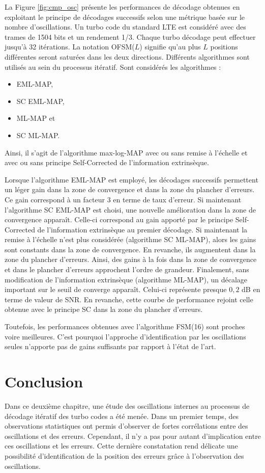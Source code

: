 La Figure \ref{fig:cmp_osc} présente les performances de décodage obtenues en exploitant le principe de décodages successifs selon une 
métrique basée sur le nombre d'oscillations. Un turbo code du standard LTE est considéré avec des trames de 1504 bits et un 
rendement 1/3. Chaque turbo décodage peut effectuer jusqu'à 32 itérations. La notation OFSM($L$) signifie qu'au plus $L$ 
positions différentes seront saturées dans les deux directions. Différents algorithmes sont utilisés au sein du
processus itératif. Sont considérés les algorithmes :
\begin{itemize}
 	\item EML-MAP,
 	\item SC EML-MAP,
 	\item ML-MAP et 
 	\item SC ML-MAP.
 \end{itemize} 
 Ainsi, il s'agit de l'algorithme 
max-log-MAP avec ou sans remise à l'échelle et avec ou sans principe Self-Corrected de l'information extrinsèque.

Lorsque l'algorithme EML-MAP est employé, les décodages successifs permettent un léger gain dans la zone de convergence 
et dans la zone du plancher d'erreurs. Ce gain correspond à un facteur 3 en terme de taux d'erreur. Si maintenant l'algorithme SC EML-MAP 
est  choisi, une nouvelle amélioration dans la zone de convergence apparaît. Celle-ci correspond au gain apporté par le 
principe Self-Corrected de l'information extrinsèque au premier décodage. Si maintenant la remise à l'échelle n'est plus 
considérée (algorithme SC ML-MAP), alors les gains sont constants dans la zone de convergence. En revanche, ils augmentent dans 
la zone du plancher d'erreurs. Ainsi, des gains à la fois dans la zone de convergence et dans le plancher d'erreurs 
approchent l'ordre de grandeur. Finalement, sans modification de l'information extrinsèque 
(algorithme ML-MAP), un décalage important sur le seuil de converge apparaît. Celui-ci représente presque $0,2$ dB en terme 
de valeur de SNR. En revanche, cette courbe de performance rejoint celle obtenue avec le principe SC dans la zone du 
plancher d'erreurs. 

Toutefois, les performances obtenues avec l'algorithme FSM(16) sont proches voire meilleures. C'est pourquoi l'approche 
d'identification par les oscillations seules n'apporte pas de gains suffisants par rapport à l'état de l'art.

\section{Conclusion}
Dans ce deuxième chapitre, une étude des oscillations internes au processus de décodage itératif des turbo codes a été 
menée. Dans un premier temps, des observations statistiques ont permis d'observer de fortes corrélations entre des oscillations
et des erreurs. Cependant, il n'y a pas pour autant d'implication entre ces oscillations et les erreurs. Cette dernière constatation 
rend délicate une possibilité d'identification de la position des erreurs grâce à l'observation des oscillations.


